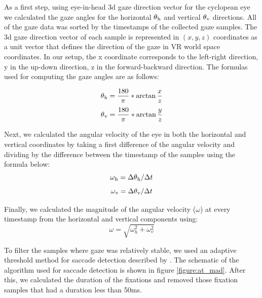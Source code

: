 As a first step, using eye-in-head 3d gaze direction vector for the cyclopean eye we calculated the gaze angles for the horizontal $\theta\textsubscript{h}$ and vertical $\theta\textsubscript{v}$ directions. All of the gaze data was sorted by the timestamps of the collected gaze samples. The 3d gaze direction vector of each sample is represented in $(x, y, z)$ coordinates as a unit vector that defines the direction of the gaze in VR world space coordinates. In our setup, the x coordinate corresponds to the left-right direction, y in the up-down direction, z in the forward-backward direction. The formulas used for computing the gaze angles are as follows:

 \begin{equation}\label{eq:h_angle}
     \theta\textsubscript{h} = \frac{180}{\pi} * \arctan{\frac{x}{z}}
 \end{equation}   
  \begin{equation}\label{eq:v_angle}
     \theta\textsubscript{v} = \frac{180}{\pi} * \arctan{\frac{y}{z}} 
 \end{equation}   
 
Next, we calculated the angular velocity of the eye in both the horizontal and vertical coordinates by taking a first difference of the angular velocity and dividing by the difference between the timestamp of the samples using the formula below:
\begin{equation}\label{eq:h_vel_angle}
    \omega\textsubscript{h} = \Delta\theta\textsubscript{h} / \Delta t
 \end{equation}  
 \begin{equation}\label{eq:v_vel_angle}
     \omega\textsubscript{v} = \Delta\theta\textsubscript{v} / \Delta t
 \end{equation}  

Finally, we calculated the magnitude of the angular velocity ($\omega$) at every timestamp from the horizontal and vertical components using:
\begin{equation}\label{eq:vel_angle}
     \omega = \sqrt{\omega_h^2 + \omega_v^2}
 \end{equation}  

To filter the samples where gaze was relatively stable, we used an adaptive threshold method for saccade detection described by \citet{Voloh2019-oc}. The schematic of the algorithm used for saccade detection is shown in figure \ref{figure:at_mad}. After this, we calculated the duration of the fixations and removed those fixation samples that had a duration less than 50ms.

